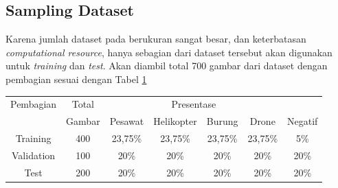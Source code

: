   \subsection{Sampling Dataset}
    Karena jumlah dataset pada \textcite{aot_dataset} berukuran sangat besar, dan keterbatasan
    \emph{computational resource}, hanya sebagian dari dataset tersebut akan digunakan untuk \emph{training} dan \emph{test}.
    Akan diambil total 700 gambar dari dataset dengan pembagian sesuai dengan Tabel \ref{tbl:datasetsamplingdist}
    \begin{table}[h]
      \centering
      \label{tbl:datasetsamplingdist}
      \begin{tabular}{|c|c|c|c|c|c|c|}
        \hline
        Pembagian &Total & \multicolumn{4}{c}{Presentase}&\\
                           \cline{2-7}
                  &Gambar& Pesawat & Helikopter & Burung & Drone & Negatif\\
        \hline
        Training  &400 &23,75\%  &23,75\%     &23,75\% &23,75\%       &5\%\\
        \hline                                              
        Validation&100  &20\%     &20\%        &20\%    &20\%          &20\%\\
        \hline                                                           
        Test      &200  &20\%     &20\%        &20\%    &20\%          &20\%\\
        \hline
      \end{tabular}
    \end{table}



